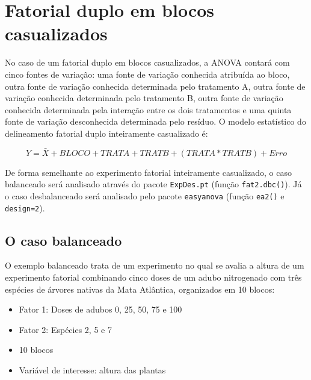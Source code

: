 \documentclass[
]{article}
\providecommand{\tightlist}{%
  \setlength{\itemsep}{0pt}\setlength{\parskip}{0pt}}
\begin{document}
\hypertarget{fatorial-duplo-em-blocos-casualizados}{%
\section{Fatorial duplo em blocos casualizados}\label{fatorial-duplo-em-blocos-casualizados}}

No caso de um fatorial duplo em blocos casualizados, a ANOVA contará com cinco fontes de variação: uma fonte de variação conhecida atribuída ao bloco, outra fonte de variação conhecida determinada pelo tratamento A, outra fonte de variação conhecida determinada pelo tratamento B, outra fonte de variação conhecida determinada pela interação entre os dois tratamentos e uma quinta fonte de variação desconhecida determinada pelo resíduo. O modelo estatístico do delineamento fatorial duplo inteiramente casualizado é:

\[Y = \bar{X} + BLOCO + TRAT A + TRAT B + (TRAT A * TRAT B) + Erro\]

De forma semelhante ao experimento fatorial inteiramente casualizado, o caso balanceado será analisado através do pacote \texttt{ExpDes.pt} (função \texttt{fat2.dbc()}). Já o caso desbalanceado será analisado pelo pacote \texttt{easyanova} (função \texttt{ea2()} e \texttt{design=2}).

\hypertarget{o-caso-balanceado-3}{%
\subsection{O caso balanceado}\label{o-caso-balanceado-3}}

O exemplo balanceado trata de um experimento no qual se avalia a altura de um experimento fatorial combinando cinco doses de um adubo nitrogenado com três espécies de árvores nativas da Mata Atlântica, organizados em 10 blocos:

\begin{itemize}
\tightlist
\item
  Fator 1: Doses de adubos 0, 25, 50, 75 e 100
\item
  Fator 2: Espécies 2, 5 e 7
\item
  10 blocos
\item
  Variável de interesse: altura das plantas
\end{itemize}
\end{document}
